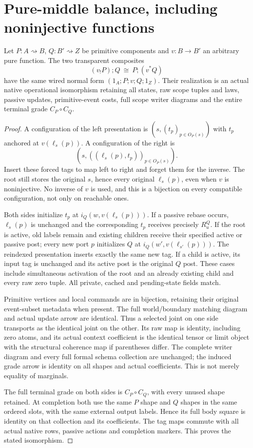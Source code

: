 \documentclass[11pt]{article}
\begin{document}
\section{Pure-middle balance, including noninjective functions}
\begin{theorem}
Let $P:A\rightsquigarrow B$, $Q:B'\rightsquigarrow Z$ be primitive components and $v:B\to B'$ an arbitrary pure function. The two transparent composites
\[
 (v_!P);Q\ \cong\ P;(v^*Q)                             \tag{B}
\]
have the same wired normal form $(1_A;P;v;Q;1_Z)$. Their realization is an actual native operational isomorphism retaining all states, raw scope tuples and laws, passive updates, primitive-event costs, full scope writer diagrams and the entire terminal grade $C_P\circ C_Q$.
\end{theorem}
\begin{proof}
A configuration of the left presentation is $(s,(t_p)_{p\in O_P(s)})$ with $t_p$ anchored at $v(\ell_s(p))$. A configuration of the right is
\[
 (s,((\ell_s(p),t_p))_{p\in O_P(s)}).
\]
Insert these forced tags to map left to right and forget them for the inverse. The root still stores the original $s$, hence every original $\ell_s(p)$, even when $v$ is noninjective. No inverse of $v$ is used, and this is a bijection on every compatible configuration, not only on reachable ones.

Both sides initialize $t_p$ at $i_Q(w,v(\ell_s(p)))$. If a passive rebase occurs, $\ell_s(p)$ is unchanged and the corresponding $t_p$ receives precisely $R_u^Q$. If the root is active, old labels remain and existing children receive their specified active or passive post; every new port $p$ initializes $Q$ at $i_Q(w',v(\ell_{s'}(p)))$. The reindexed presentation inserts exactly the same new tag. If a child is active, its input tag is unchanged and its active post is the original $Q$ post. These cases include simultaneous activation of the root and an already existing child and every raw zero tuple. All private, cached and pending-state fields match.

Primitive vertices and local commands are in bijection, retaining their original event-subset metadata when present. The full world/boundary matching diagram and actual update arrow are identical. Thus a selected joint on one side transports as the identical joint on the other. Its raw map is identity, including zero atoms, and its actual context coefficient is the identical tensor or limit object with the structural coherence map if parentheses differ. The complete writer diagram and every full formal schema collection are unchanged; the induced grade arrow is identity on all shapes and actual coefficients. This is not merely equality of marginals.

The full terminal grade on both sides is $C_P\circ C_Q$, with every unused shape retained. At completion both use the same $P$ shape and $Q$ shapes in the same ordered slots, with the same external output labels. Hence its full body square is identity on that collection and its coefficients. The tag maps commute with all actual native rows, passive actions and completion markers. This proves the stated isomorphism.\end{proof}
\end{document}

